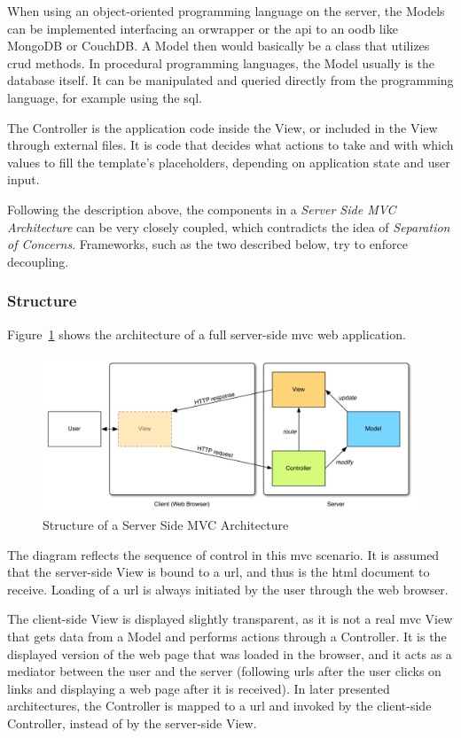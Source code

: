 When using an object-oriented programming language on the server, the Models can be implemented interfacing an \gls{orwrapper} or the \ac{api} to an \gls{oodb} like MongoDB or CouchDB. A Model then would basically be a class that utilizes \ac{crud} methods. In procedural programming languages, the Model usually is the database itself. It can be manipulated and queried directly from the programming language, for example using the \ac{sql}.

The Controller is the application code inside the View, or included in the View through external files. It is code that decides what actions to take and with which values to fill the template's placeholders, depending on application state and user input.

Following the description above, the components in a \emph{Server Side MVC Architecture} can be very closely coupled, which contradicts the idea of \emph{Separation of Concerns}. Frameworks, such as the two described below, try to enforce decoupling.

\subsubsection{Structure}
Figure~\ref{fig:thinclientmvc} shows the architecture of a full server-side \ac{mvc} web application.
\begin{figure}[H]
	\centering
	\includegraphics[width=16cm]{images/thinclientmvc.pdf}
	\caption{Structure of a Server Side MVC Architecture}
	\label{fig:thinclientmvc}
\end{figure}

The diagram reflects the sequence of control in this \ac{mvc} scenario. It is assumed that the server-side View is bound to a \ac{url}, and thus is the \ac{html} document to receive. Loading of a \ac{url} is always initiated by the user through the web browser.

The client-side View is displayed slightly transparent, as it is not a real \ac{mvc} View that gets data from a Model and performs actions through a Controller. It is the displayed version of the web page that was loaded in the browser, and it acts as a mediator between the user and the server (following \glspl{url} after the user clicks on links and displaying a web page after it is received). In later presented architectures, the Controller is mapped to a \gls{url} and invoked by the client-side Controller, instead of by the server-side View.

